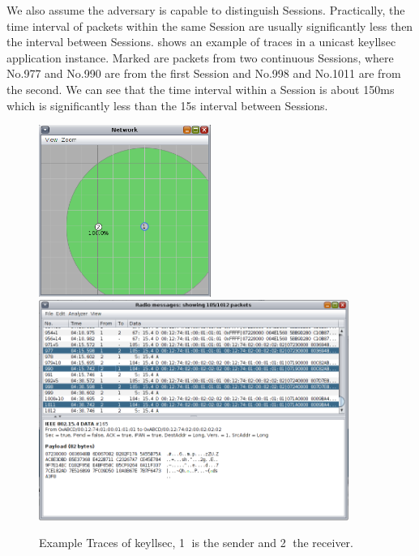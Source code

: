 We also assume the adversary is capable to distinguish Sessions. Practically, the time interval of packets within the same Session are usually significantly less then the interval between Sessions.  shows an example of traces in a unicast keyllsec application instance. Marked are packets from two continuous Sessions, where No.977 and No.990 are from the first Session and No.998 and No.1011 are from the second. We can see that the time interval within a Session is about 150ms which is significantly less than the 15s interval between Sessions.

\begin{figure}[th!]
	\center
	\includegraphics[width=0.5\textwidth]{fig/unicast_keyllsec.png}
	\\
	\includegraphics[width=0.9\textwidth]{fig/trace_keyllsec.png}
	\caption{
		Example Traces of keyllsec, \textcircled{1} is the sender and \textcircled{2} the receiver.
	}
	\label{Fig: Example Traces of keyllsec}
\end{figure}


